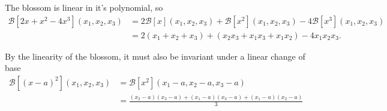 \documentclass{article}
\begin{document}
The blossom is linear in it's polynomial,
so
\begin{equation*}\begin{aligned}
    \mathcal B[2x + x^2 - 4x^3](x_1,x_2,x_3) 
    &=2\mathcal B[x](x_1,x_2,x_3) + \mathcal B[x^2](x_1,x_2,x_3) - 4\mathcal B[x^3](x_1,x_2,x_3)\\
    &= 2(x_1 + x_2 + x_3) + (x_2x_3 + x_1x_3 + x_1x_2) - 4x_1x_2x_3.
\end{aligned}
\end{equation*}

By the linearity of the blossom, it must also be invariant under a linear change of base
\begin{equation*}\begin{aligned}
    \mathcal B[(x - a)^2](x_1,x_2,x_3)
    &= \mathcal B[x^2](x_1 - a,x_2 - a, x_3 - a)\\
    &= \frac{(x_2 - a)(x_3 - a) + (x_1 - a)(x_3 - a) + (x_1 - a)(x_2 - a)} 3
\end{aligned}
\end{equation*}
\end{document}

